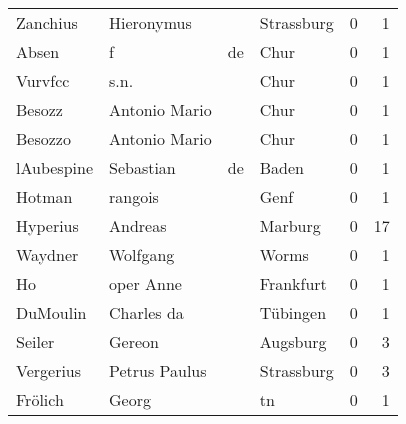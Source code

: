 \begin{tabular}{llllrr}
                 Zanchius &                         Hieronymus &             &                                  Strassburg &          0 &         1 \\
                    Absen &                                  f &          de &                                        Chur &          0 &         1 \\
                  Vurvfcc &                               s.n. &             &                                        Chur &          0 &         1 \\
                   Besozz &                      Antonio Mario &             &                                        Chur &          0 &         1 \\
                  Besozzo &                      Antonio Mario &             &                                        Chur &          0 &         1 \\
               lAubespine &                          Sebastian &          de &                                       Baden &          0 &         1 \\
                   Hotman &                            rangois &             &                                        Genf &          0 &         1 \\
                 Hyperius &                            Andreas &             &                                     Marburg &          0 &        17 \\
                  Waydner &                           Wolfgang &             &                                       Worms &          0 &         1 \\
                       Ho &                          oper Anne &             &                                   Frankfurt &          0 &         1 \\
                 DuMoulin &                         Charles da &             &                                    Tübingen &          0 &         1 \\
                   Seiler &                             Gereon &             &                                    Augsburg &          0 &         3 \\
                Vergerius &                      Petrus Paulus &             &                                  Strassburg &          0 &         3 \\
                  Frölich &                              Georg &             &                                          tn &          0 &         1 \\

\end{tabular}
